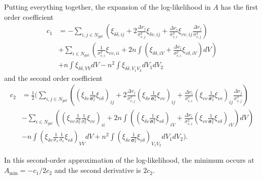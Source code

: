 \documentclass{article}
\begin{document}
Putting everything together, the expansion of the log-likelihood in $A$ has the first order coefficient
\begin{align}
c_1 &=- \sum_{i,j\in N_{gal}} \left( \xi_{\delta\delta,ij} + 2  \frac{\Delta v_j}{\sigma_{v,j}^2} \xi_{\delta v,ij} + \frac{\Delta v_i}{\sigma_{v,i}^2} \xi_{vv,ij} \frac{\Delta v_j}{\sigma_{v,j}^2}\right)\\
& +\sum_{i \in N_{gal}} \left( \frac{1}{\sigma_{v,i}^2} \xi_{vv,ii}   + 2n \int \left(\xi_{\delta\delta,iV} + \frac{\Delta v_i}{\sigma_{v,i}^2} \xi_{v \delta,iV}\right) dV  \right)\\
& +n \int \xi_{\delta\delta,VV} dV  -n^2  \int \xi_{\delta\delta,V_1V_2}dV_1dV_2
\end{align}
and the second order coefficient
\begin{align}
c_2 & = \frac{1}{2} \Biggl( 
 \sum_{i,j\in N_{gal}} \left( \left(\xi_{\delta v}\frac{1}{\bm{\sigma}_v^2}  \xi_{v \delta}\right)_{ij}
 + 2  \frac{\Delta v_j}{\sigma_{v,j}^2} \left(\xi_{\delta v} \frac{1} {\bm{\sigma}_v^2} \xi_{vv}  \right)_{ij} + \frac{\Delta v_i}{\sigma_{v,i}^2} \left( \xi_{vv} \frac{1}{\bm{\sigma}_v^2} \xi_{vv}\right)_{ij} \frac{\Delta v_j}{\sigma_{v,j}^2}\right)\\
&- \sum_{i \in N_{gal}}\left( \left(  \xi_{vv} \frac{1}{\sigma_{v}^2}  \frac{1}{\sigma_{v}^2} \xi_{vv} \right)_{ii}  +2n \int \left( \left(\xi_{\delta v}\frac{1}{\bm{\sigma}_v^2}  \xi_{v \delta}\right)_{iV} + \frac{\Delta v_i}{\sigma_{v,i}^2} \left( \xi_{v v} \frac{1} {\bm{\sigma}_v^2} \xi_{v \delta}  \right)_{iV} \right) dV  \right)\\
&-n  \int \left( \xi_{\delta v} \frac{1}{\sigma_{v}}  \frac{1}{\sigma_{v}}  \xi_{v \delta} \right)_{VV} dV  +n^2  \int  \left(\xi_{\delta v}\frac{1}{\bm{\sigma}_v^2}  \xi_{v \delta}\right)_{V_1V_2}dV_1dV_2 \Biggr).
\end{align}

In this second-order approximation of the log-likelihood, the minimum occurs at $A_{\text{min}}=-c_1/2c_2$ and the second derivative is $2c_2$.
\end{document}
